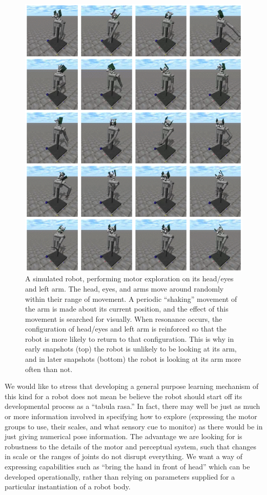 \begin{figure}[p]
\centerline{\includegraphics[width=\textwidth]{images/find-arm}}
\caption{
%
\label{fig:find-arm}
%
A simulated robot, performing motor exploration on its
head/eyes and left arm.  The head, eyes, and arms move around randomly
within their range of movement.
%
A periodic ``shaking'' movement of the arm is made about its
current position, and the effect of this movement is searched 
for visually.
%
When resonance occurs, the configuration of head/eyes and left arm
is reinforced so that the robot is more likely to return to that
configuration.
%
This is why 
in early snapshots (top) the robot is unlikely to be looking at 
its arm, and in later snapshots (bottom) the robot is looking at
its arm more often than not.
%
}
\end{figure}


We would like to stress that developing a general purpose learning
mechanism of this kind for a robot does not mean be believe the robot
should start off its developmental process as a ``tabula rasa.''  In
fact, there may well be just as much or more information involved in
specifying how to explore (expressing the motor groups to use, their
scales, and what sensory cue to monitor) as there would be in just
giving numerical pose information.
%
The advantage we are looking for is robustness to the details of 
the motor and perceptual system, such that changes in scale or the
ranges of joints do not disrupt everything.
%
We want a way of expressing capabilities such as ``bring the hand in
front of head'' which can be developed operationally, rather than
relying on parameters supplied for a particular instantiation
of a robot body.

